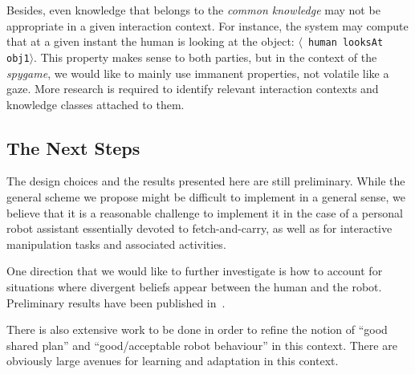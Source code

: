 \documentclass[preprint,3p,times]{elsarticle}
\newcommand{\stmt}[1]{{\footnotesize \tt $\langle$ #1\relax$\rangle$}}
\begin{document}
Besides, even knowledge that belongs to the \emph{common knowledge} may not be
appropriate in a given interaction context. For instance, the system may
compute that at a given instant the human is looking at the object: \stmt{human
looksAt obj1}. This property makes sense to both parties, but in the context of
the \emph{spygame}, we would like to mainly use immanent properties, not
volatile like a gaze. More research is required to identify relevant
interaction contexts and knowledge classes attached to them.


\subsection{The Next Steps}


The design choices and the results presented here are still preliminary.
While the general scheme we propose might be difficult to implement in
a general sense, we believe that it is a reasonable challenge to
implement it in the case of a personal robot assistant essentially
devoted to fetch-and-carry, as well as for interactive manipulation
tasks and associated activities.

One direction that we would like to further investigate is how to account for
situations where divergent beliefs appear between the human and the robot.
Preliminary results have been published in~\cite{warnier2012when}.

There is also extensive work to be done in order to refine the notion of ``good
shared plan'' and ``good/acceptable robot behaviour'' in this context. There are
obviously large avenues for learning and adaptation in this context.
\end{document}
